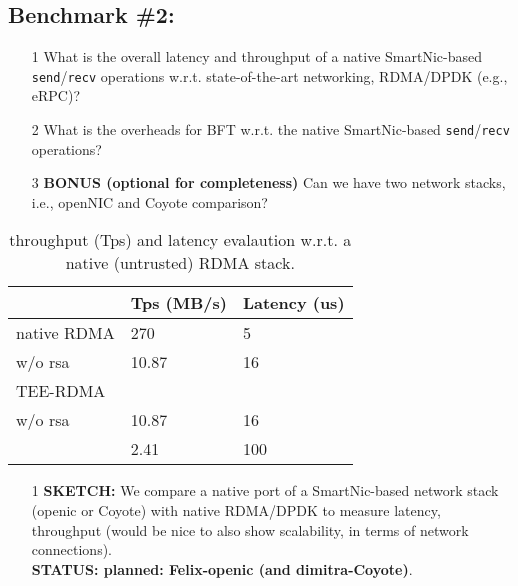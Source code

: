 \subsection{Benchmark \#2: \projecttitle{}}
\begin{itemize}
    \item[1] What is the overall latency and throughput of a native SmartNic-based \texttt{send}/\texttt{recv} operations w.r.t. state-of-the-art networking, RDMA/DPDK (e.g., eRPC)?
    \item[2] What is the overheads for BFT w.r.t. the native SmartNic-based \texttt{send}/\texttt{recv} operations?
    \item[3] {\bf \color{red} BONUS (optional for completeness)} Can we have two network stacks, i.e., openNIC and Coyote comparison?
\end{itemize}


\begin{center}
\begin{table}[ht]
\centering
\begin{tabular}{ |m{3cm}||m{2cm}|m{2cm}|}
 \hline
  & Tps (MB/s) & Latency (us) \\
  \hline
 native RDMA & 270 & 5  \\
 \projecttitle{} w/o rsa & 10.87 & 16 \\
 TEE-RDMA &  &  \\
 \projecttitle{} w/o rsa & 10.87 & 16 \\
 \projecttitle{} & 2.41 & 100 \\
 \hline
 \end{tabular}
\caption{\projecttitle{} throughput (Tps) and latency evalaution w.r.t. a native (untrusted) RDMA stack.}
\end{table}\label{res:net_stack}
\end{center}







{\color{blue} 
\begin{itemize}
    \item[1] {\bf SKETCH:} We compare a native port of a SmartNic-based network stack (openic or Coyote) with native RDMA/DPDK to measure latency, throughput (would be nice to also show scalability, in terms of network connections). 
    \\ {\bf STATUS: planned: Felix-openic (and dimitra-Coyote)}.
\end{itemize}
}


